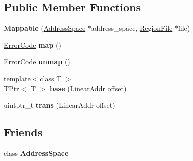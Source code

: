 \subsection*{Public Member Functions}
\begin{DoxyCompactItemize}
\item 
{\bfseries Mappable} (\hyperlink{classalps_1_1AddressSpace}{Address\+Space} $\ast$address\+\_\+space, \hyperlink{classalps_1_1RegionFile}{Region\+File} $\ast$file)\hypertarget{classalps_1_1Mappable_a0dd4c0bbb33fd9268b8459b184440705}{}\label{classalps_1_1Mappable_a0dd4c0bbb33fd9268b8459b184440705}

\item 
\hyperlink{group__ERRORCODES_ga6263a3c9a0b8d36aea21cdd835ac99fe}{Error\+Code} {\bfseries map} ()\hypertarget{classalps_1_1Mappable_a5ae691f7e71cac7cc58155703ef4a5ac}{}\label{classalps_1_1Mappable_a5ae691f7e71cac7cc58155703ef4a5ac}

\item 
\hyperlink{group__ERRORCODES_ga6263a3c9a0b8d36aea21cdd835ac99fe}{Error\+Code} {\bfseries unmap} ()\hypertarget{classalps_1_1Mappable_a8394bd3c972b7c8d4c98604d71217f25}{}\label{classalps_1_1Mappable_a8394bd3c972b7c8d4c98604d71217f25}

\item 
{\footnotesize template$<$class T $>$ }\\T\+Ptr$<$ T $>$ {\bfseries base} (Linear\+Addr offset)\hypertarget{classalps_1_1Mappable_abe9367121a591f7b8a351a8a808bd838}{}\label{classalps_1_1Mappable_abe9367121a591f7b8a351a8a808bd838}

\item 
uintptr\+\_\+t {\bfseries trans} (Linear\+Addr offset)\hypertarget{classalps_1_1Mappable_a3a022abb4190c60948d60bece0188c48}{}\label{classalps_1_1Mappable_a3a022abb4190c60948d60bece0188c48}

\end{DoxyCompactItemize}
\subsection*{Friends}
\begin{DoxyCompactItemize}
\item 
class {\bfseries Address\+Space}\hypertarget{classalps_1_1Mappable_a4c0de12c4816e1f285ed094ad8c7f9c8}{}\label{classalps_1_1Mappable_a4c0de12c4816e1f285ed094ad8c7f9c8}

\end{DoxyCompactItemize}



